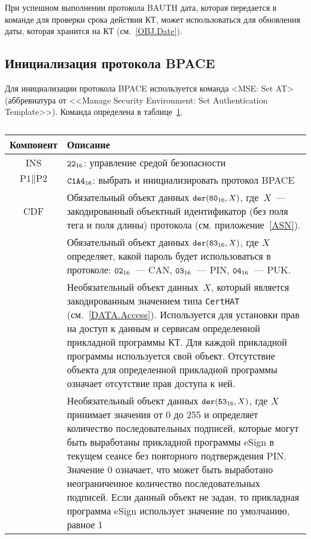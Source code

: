 При успешном выполнении протокола BAUTH дата, которая передается в команде 
для проверки срока действия КТ, может использоваться для обновления 
даты, которая хранится на КТ (см.~\ref{OBJ.Date}). 

\subsection{Инициализация протокола BPACE}
\label{Oper.Descr.SetBPACE}

Для инициализации протокола BPACE используется команда
<MSE: Set AT> (аббревиатура от <<Manage Security Environment: Set 
Authentication Template>>). Команда определена в 
таблице~\ref{Table.Oper.SetBPACECmd}. 

\begin{table}[h]
\caption{}\label{Table.Oper.SetBPACECmd}
\begin{tabular}{|c|p{14cm}|}
\hline
Компонент & Описание \\
\hline
\hline
INS & $\texttt{22}_{16}$: управление средой безопасности\\ 
\hline
$\text{P1} \parallel\text{P2}$ & $\texttt{C1A4}_{16}$: выбрать и 
инициализировать протокол BPACE\\ 
\hline
CDF & Обязательный объект данных 
$\texttt{der}(\texttt{80}_{16}, X)$, где~$X$~--- 
закодированный объектный идентификатор (без поля тега и поля 
длины) протокола (см. приложение~\ref{ASN}).\\
& Обязательный объект данных $\texttt{der}(\texttt{83}_{16}, X)$, 
где $X$ определяет, какой пароль будет использоваться в протоколе: 
$\texttt{02}_{16}$~--- CAN,  $\texttt{03}_{16}$~--- PIN, 
$\texttt{04}_{16}$~--- PUK.\\
 & Необязательный объект данных~$X$, который является 
закодированным значением типа \verb|CertHAT| (см.~\ref{DATA.Access}). 
Используется для установки прав на доступ 
к данным и сервисам определенной прикладной программы КТ.
Для каждой прикладной программы используется свой объект.
Отсутствие объекта для определенной прикладной
программы означает отсутствие прав доступа к ней. \\
 & Необязательный объект данных $\texttt{der}(\texttt{53}_{16}, X)$, 
где $X$ принимает значения от 0 до 255 и 
определяет количество последовательных подписей, 
которые могут быть выработаны прикладной программы eSign
в текущем сеансе без повторного подтверждения PIN.
Значение 0 означает, что может быть выработано 
неограниченное количество последовательных подписей. 
Если данный объект не задан, то прикладная программа eSign 
использует значение по умолчанию, равное 1 \\

\end{tabular}
\end{table}
